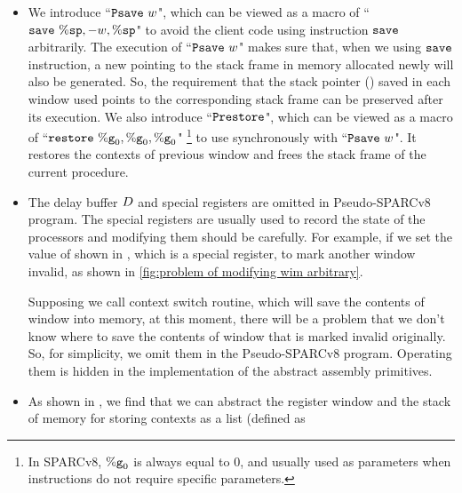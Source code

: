 \begin{itemize}
    \item
    We introduce ``$\texttt{Psave} \ w$", 
    which can be viewed as a macro of 
    ``$\csave{} \ \spreg, -\word, \spreg$" to 
    avoid the client code using instruction 
    $\texttt{save}{}$ arbitrarily. The execution of 
    ``$\texttt{Psave} \ w$" makes sure that, when 
    we using $\texttt{save}{}$ instruction, a new 
    \spreg{} pointing to the stack frame in 
    memory allocated newly will also be generated. 
    So, the requirement that the stack pointer (\spreg) 
    saved in each window used points to the corresponding 
    stack frame can be preserved after its execution. 
    We also introduce ``$\texttt{Prestore}$", which can 
    be viewed as a macro of ``$\texttt{restore}{} \ \%\texttt{g}_{0}, \%\texttt{g}_{0}, \%\texttt{g}_{0}$"
    \footnote{In SPARCv8, $\%\texttt{g}_{0}$ is always equal to 0, 
    and usually used as parameters when instructions do not 
    require specific parameters.} to use synchronously 
    with ``$\texttt{Psave} \ w$". It restores the contexts 
    of previous window and frees the stack frame of 
    the current procedure.
    \item 
    The delay buffer $D$ and special registers 
    are omitted in Pseudo-SPARCv8 program. The special registers 
    are  usually  used  to  record  the state 
    of the processors and modifying them should be carefully. 
    For example,  
    if we set the value of \regwim{} shown in 
    \Fig{\ref{fig:Abstraction of Register Windows and Memory}}, 
    which is a special register, to mark another window 
    invalid, as shown in  
    \ref{fig:problem of modifying wim arbitrary}. 
    \begin{center}
        
        \label{fig:problem of modifying wim arbitrary}
    \end{center}
    Supposing we call context switch routine, which will  
    save the contents of window into memory, at this moment, 
    there will be a problem that we don't know 
    where to save the contents of window that 
    is marked invalid originally. 
    So, for simplicity, we omit them 
    in the Pseudo-SPARCv8 program. Operating them 
    is hidden in the implementation of the 
    abstract assembly primitives. 
    \item 
    As shown in \Fig{\ref{fig:Abstraction of Register Windows and Memory}}, 
    we find that we can abstract the register window 
    and the stack of memory for storing contexts as a list (defined as 

\end{itemize}
